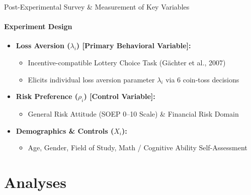 \documentclass{beamer}
\begin{document}
\begin{frame}{Post-Experimental Survey \& Measurement of Key Variables}
\framesubtitle{Experiment Design}

    \begin{itemize}
        \item \textbf{Loss Aversion ($\lambda_i$) [Primary Behavioral Variable]:}
        \begin{itemize}
            \item Incentive-compatible Lottery Choice Task (Gächter et al., 2007)
            \item Elicits individual loss aversion parameter $\lambda_i$ via 6 coin-toss decisions
        \end{itemize}

        \vspace{0.15cm}

        \item \textbf{Risk Preference ($\rho_i$) [Control Variable]:}
        \begin{itemize}
            \item General Risk Attitude (SOEP 0--10 Scale) \& Financial Risk Domain
        \end{itemize}

        \vspace{0.15cm}

        \item \textbf{Demographics \& Controls ($X_i$):}
        \begin{itemize}
            \item Age, Gender, Field of Study, Math / Cognitive Ability Self-Assessment
        \end{itemize}
    \end{itemize}

\end{frame}

\section{Analyses}
\end{document}
